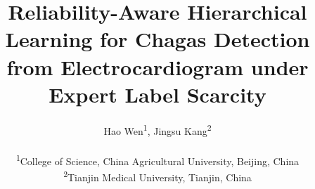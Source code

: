 \documentclass[twocolumn]{cinc}
\title{Reliability-Aware Hierarchical Learning for Chagas Detection from Electrocardiogram under Expert Label Scarcity}
\author{Hao Wen\textsuperscript{1},
Jingsu Kang\textsuperscript{2} \\ \ \\
\textsuperscript{1}College of Science, China Agricultural University, Beijing, China\\
\textsuperscript{2}Tianjin Medical University, Tianjin, China
}
\begin{document}
\maketitle



\begin{abstract}








\end{abstract}
\end{document}
